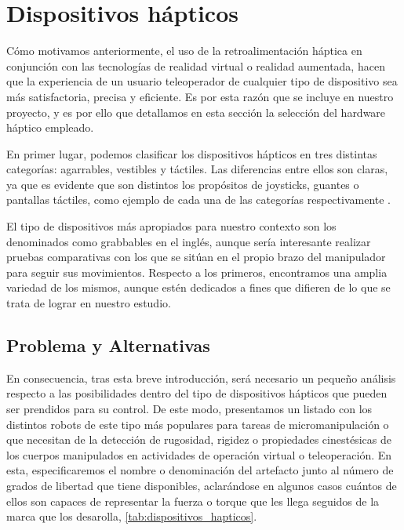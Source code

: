 \section{Dispositivos hápticos}
Cómo motivamos anteriormente, el uso de la retroalimentación háptica en conjunción con las tecnologías de realidad virtual o realidad aumentada, hacen que la experiencia de un usuario teleoperador de cualquier tipo de dispositivo sea más satisfactoria, precisa y eficiente. Es por esta razón que se incluye en nuestro proyecto, y es por ello que detallamos en esta sección la selección del hardware háptico empleado.

En primer lugar, podemos clasificar los dispositivos hápticos en tres distintas categorías: agarrables, vestibles y táctiles. Las diferencias entre ellos son claras, ya que es evidente que son distintos los propósitos de joysticks, guantes o pantallas táctiles, como ejemplo de cada una de las categorías respectivamente \cite{57}.

El tipo de dispositivos más apropiados para nuestro contexto son los denominados como grabbables en el inglés, aunque sería interesante realizar pruebas comparativas con los que se sitúan en el propio brazo del manipulador para seguir sus movimientos. Respecto a los primeros, encontramos una amplia variedad de los mismos, aunque estén dedicados a fines que difieren de lo que se trata de lograr en nuestro estudio.

\subsection{Problema y Alternativas}
En consecuencia, tras esta breve introducción, será necesario un pequeño análisis respecto a las posibilidades dentro del tipo de  dispositivos hápticos que pueden ser prendidos para su control. De este modo, presentamos un listado con los distintos robots de este tipo más populares para tareas de micromanipulación o  que necesitan de la detección de rugosidad, rigidez o propiedades cinestésicas de los cuerpos manipulados en actividades de operación virtual o teleoperación. En esta, especificaremos el nombre o denominación del artefacto junto al número de grados de libertad que tiene disponibles, aclarándose en algunos casos cuántos de ellos son capaces de representar la fuerza o torque que les llega seguidos de la marca que los desarolla, \ref{tab:dispositivos_hapticos}.


